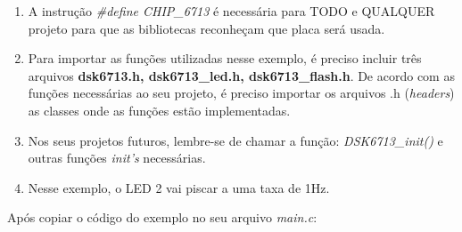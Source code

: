 \documentclass[a4paper, 12pt]{article}
\begin{document}
\begin{enumerate}
	\item A instrução \textit{\#define CHIP\_6713} é necessária para TODO e QUALQUER projeto para que as bibliotecas reconheçam que placa será usada.
	\item Para importar as funções utilizadas nesse exemplo, é preciso incluir três arquivos \textbf{dsk6713.h, dsk6713\_led.h, dsk6713\_flash.h}. De acordo com as funções necessárias ao seu projeto, é preciso importar os arquivos .h (\textit{headers}) as classes onde as funções estão implementadas.
	\item Nos seus projetos futuros, lembre-se de chamar a função: \textit{DSK6713\_init()} e outras funções \textit{init's} necessárias.
	\item Nesse exemplo, o LED 2 vai piscar a uma taxa de 1Hz.
\end{enumerate}

Após copiar o código do exemplo no seu arquivo \textit{main.c}:
\end{document}
